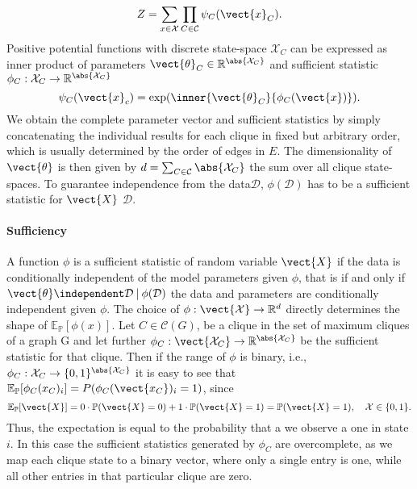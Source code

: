 \begin{equation}
    Z = \sum_{x\in \mathcal{X}} \prod_{C \in \mathcal{C}} \psi_C(\vect{x}_C).
\end{equation}
Positive potential functions with discrete state-space $\mathcal{X}_C$ can be expressed as inner product of parameters $\vect{\theta}_C \in \mathbb{R}^{\abs{\mathcal{X}_C}}$ and sufficient statistic $\phi_C: \mathcal{X}_C \rightarrow \mathbb{R}^{\abs{\mathcal{X}_C}}$ 
\begin{equation}
    \psi_C(\vect{x}_c) = \exp(\inner{\vect{\theta}_C}{\phi_C(\vect{x})}).
\end{equation}
We obtain the complete parameter vector and sufficient statistics by simply concatenating the individual results for each clique in fixed but arbitrary order, which is usually determined by the order of edges in $E$.
The dimensionality of $\vect{\theta}$ is then given by $d = \sum_{C \in \mathcal{C}} \abs{\mathcal{X}_C}$ the sum over all clique state-spaces.
To guarantee independence from the data$\mathcal{D}$,  $\phi(\mathcal{D})$ has to be a sufficient statistic for $\vect{X}$ \wrt $\mathcal{D}$.
\paragraph*{Sufficiency}
    A function $\phi$  is a sufficient statistic of random variable $\vect{X}$ if the data is conditionally independent of the model parameters given $\phi$, that is if and only if $\vect{\theta}\independent \mathcal{D} \:\lvert\: \phi(\mathcal{D})$ the data and parameters are conditionally independent given $\phi$.
    The choice of $\phi: \vect{\mathcal{X}} \rightarrow \mathbb{R}^d$ directly determines the shape of  $\mathbb{E}_{\mathbb{P}}[\phi(x)]$.
    Let $C \in \mathcal{C}(G)$, be a clique in the set of maximum cliques of a graph G and let further
    $\phi_C: \vect{\mathcal{X}_C} \rightarrow \mathbb{R}^{\abs{\mathcal{X}_C}}$ be the sufficient statistic for that clique.
    Then if the range of $\phi$ is binary, i.e., $\phi_C : \mathcal{X}_C \rightarrow \{0,1\}^{\abs{\mathcal{X}_C}}$ it is easy to see that  $\mathbb{E}_{\mathbb{P}}[\phi_C(x_C)_i] = P(\phi_C(\vect{x_C})_i = 1)$, since
    \begin{equation}
        \mathbb{E}_{\mathbb{P}}[\vect{X}] = 0 \cdot \mathbb{P}(\vect{X} = 0) + 1 \cdot \mathbb{P}(\vect{X}= 1) = \mathbb{P}(\vect{X} = 1), \quad \mathcal{X} \in \{0,1\}.
    \end{equation}
    Thus, the expectation is equal to the probability that a we observe a one in state $i$.
    In this case the sufficient statistics generated by $\phi_C$ are overcomplete, as we map each clique state to a binary vector, where only a single entry is one, while all other entries in that particular clique are zero.  

